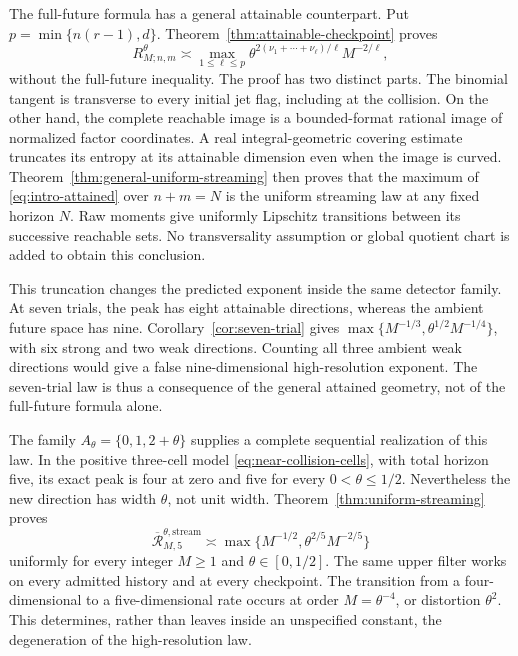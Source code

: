 The full-future formula has a general attainable counterpart. Put
$p=\min\{n(r-1),d\}$. Theorem~\ref{thm:attainable-checkpoint} proves
\begin{equation}\label{eq:intro-attained}
 R_{M;n,m}^\theta\asymp
 \max_{1\le\ell\le p}
       \theta^{2(\nu_1+\cdots+\nu_\ell)/\ell}M^{-2/\ell},
\end{equation}
without the full-future inequality. The proof has two distinct parts.
The binomial tangent is transverse to every initial jet flag, including
at the collision. On the other hand, the complete reachable image is a
bounded-format rational image of normalized factor coordinates. A real
integral-geometric covering estimate truncates its entropy at its
attainable dimension even when the image is curved. Theorem~\ref{thm:general-uniform-streaming}
then proves that the maximum of \eqref{eq:intro-attained} over
$n+m=N$ is the uniform streaming law at any fixed horizon $N$.
Raw moments give uniformly Lipschitz transitions between its successive
reachable sets. No transversality assumption or global quotient chart
is added to obtain this conclusion.

This truncation changes the predicted exponent inside the same detector
family. At seven trials, the peak has eight attainable directions, whereas
the ambient future space has nine. Corollary~\ref{cor:seven-trial}
gives $\max\{M^{-1/3},\theta^{1/2}M^{-1/4}\}$, with six strong
and two weak directions. Counting all three ambient weak directions would
give a false nine-dimensional high-resolution exponent. The seven-trial
law is thus a consequence of the general attained geometry, not of the
full-future formula alone.

The family $A_\theta=\{0,1,2+\theta\}$ supplies a complete sequential
realization of this law. In the positive three-cell model
\eqref{eq:near-collision-cells}, with total horizon five, its exact peak
is four at zero and five for every $0<\theta\le1/2$. Nevertheless the
new direction has width $\theta$, not unit width. Theorem~\ref{thm:uniform-streaming}
proves
\begin{equation}\label{eq:intro-uniform}
 \overline{\mathcal R}_{M,5}^{\theta,\mathrm{stream}}
   \asymp \max\{M^{-1/2},\theta^{2/5}M^{-2/5}\}
\end{equation}
uniformly for every integer $M\ge1$ and $\theta\in[0,1/2]$.
The same upper filter works on every admitted history and at every
checkpoint. The transition from a four-dimensional to a five-dimensional
rate occurs at order $M=\theta^{-4}$, or distortion $\theta^2$.
This determines, rather than leaves inside an unspecified constant, the
degeneration of the high-resolution law.

